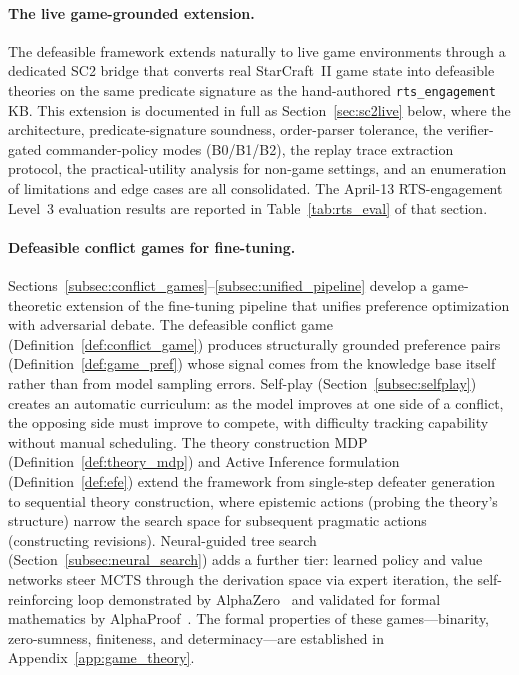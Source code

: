 \documentclass{article}
\theoremstyle{definition}
\begin{document}
\paragraph{The live game-grounded extension.} The defeasible framework extends naturally to live game environments through a dedicated SC2 bridge that converts real StarCraft~II game state into defeasible theories on the same predicate signature as the hand-authored \texttt{rts\_engagement} KB. This extension is documented in full as Section~\ref{sec:sc2live} below, where the architecture, predicate-signature soundness, order-parser tolerance, the verifier-gated commander-policy modes (B0/B1/B2), the replay trace extraction protocol, the practical-utility analysis for non-game settings, and an enumeration of limitations and edge cases are all consolidated. The April-13 RTS-engagement Level~3 evaluation results are reported in Table~\ref{tab:rts_eval} of that section.

\paragraph{Defeasible conflict games for fine-tuning.} Sections~\ref{subsec:conflict_games}--\ref{subsec:unified_pipeline} develop a game-theoretic extension of the fine-tuning pipeline that unifies preference optimization with adversarial debate. The defeasible conflict game (Definition~\ref{def:conflict_game}) produces structurally grounded preference pairs (Definition~\ref{def:game_pref}) whose signal comes from the knowledge base itself rather than from model sampling errors. Self-play (Section~\ref{subsec:selfplay}) creates an automatic curriculum: as the model improves at one side of a conflict, the opposing side must improve to compete, with difficulty tracking capability without manual scheduling. The theory construction MDP (Definition~\ref{def:theory_mdp}) and Active Inference formulation (Definition~\ref{def:efe}) extend the framework from single-step defeater generation to sequential theory construction, where epistemic actions (probing the theory's structure) narrow the search space for subsequent pragmatic actions (constructing revisions). Neural-guided tree search (Section~\ref{subsec:neural_search}) adds a further tier: learned policy and value networks steer MCTS through the derivation space via expert iteration, the self-reinforcing loop demonstrated by AlphaZero~\cite{silver2018alphazero} and validated for formal mathematics by AlphaProof~\cite{alphaproof2025}. The formal properties of these games---binarity, zero-sumness, finiteness, and determinacy---are established in Appendix~\ref{app:game_theory}.
\end{document}

